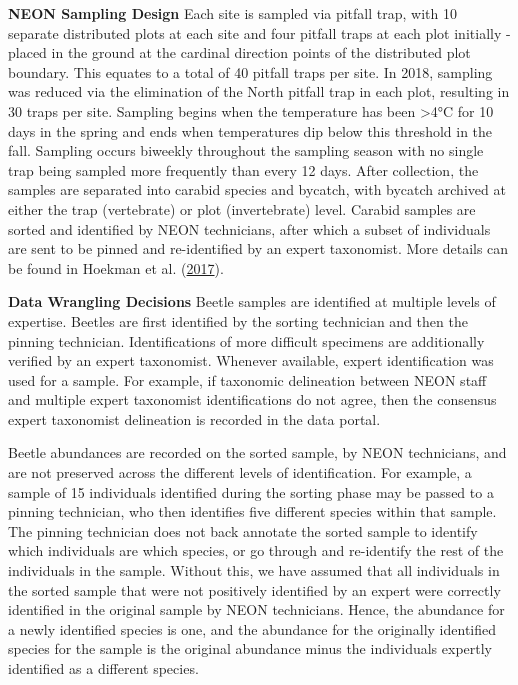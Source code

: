 \documentclass[
  12pt,
]{article}
\begin{document}
\textbf{NEON Sampling Design} Each site is sampled via pitfall trap, with 10 separate distributed plots at each site and four pitfall traps at each plot initially - placed in the ground at the cardinal direction points of the distributed plot boundary. This equates to a total of 40 pitfall traps per site. In 2018, sampling was reduced via the elimination of the North pitfall trap in each plot, resulting in 30 traps per site. Sampling begins when the temperature has been \textgreater4°C for 10 days in the spring and ends when temperatures dip below this threshold in the fall. Sampling occurs biweekly throughout the sampling season with no single trap being sampled more frequently than every 12 days. After collection, the samples are separated into carabid species and bycatch, with bycatch archived at either the trap (vertebrate) or plot (invertebrate) level. Carabid samples are sorted and identified by NEON technicians, after which a subset of individuals are sent to be pinned and re-identified by an expert taxonomist. More details can be found in Hoekman et al. (\protect\hyperlink{ref-hoekman2017design}{2017}).

\textbf{Data Wrangling Decisions} Beetle samples are identified at multiple levels of expertise. Beetles are first identified by the sorting technician and then the pinning technician. Identifications of more difficult specimens are additionally verified by an expert taxonomist. Whenever available, expert identification was used for a sample. For example, if taxonomic delineation between NEON staff and multiple expert taxonomist identifications do not agree, then the consensus expert taxonomist delineation is recorded in the data portal.

Beetle abundances are recorded on the sorted sample, by NEON technicians, and are not preserved across the different levels of identification. For example, a sample of 15 individuals identified during the sorting phase may be passed to a pinning technician, who then identifies five different species within that sample. The pinning technician does not back annotate the sorted sample to identify which individuals are which species, or go through and re-identify the rest of the individuals in the sample. Without this, we have assumed that all individuals in the sorted sample that were not positively identified by an expert were correctly identified in the original sample by NEON technicians. Hence, the abundance for a newly identified species is one, and the abundance for the originally identified species for the sample is the original abundance minus the individuals expertly identified as a different species.
\end{document}
